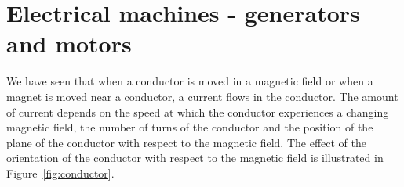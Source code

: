 \section{Electrical machines - generators and motors}

We have seen that when a conductor is moved in a magnetic field or when a magnet is moved near a conductor, a current flows in the conductor. The amount of current depends on the speed at which the conductor experiences a changing magnetic field, the number of turns of the conductor and the position of the plane of the conductor with respect to the magnetic field. The effect of the orientation of the conductor with respect to the magnetic field is illustrated in Figure~\ref{fig:conductor}. 

